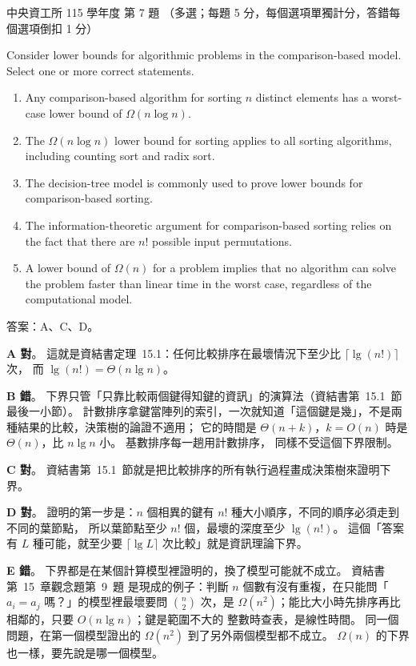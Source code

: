 \begin{pastexam}[label={px:ncu-115-dsa-07}]{中央資工所 115 學年度 第 7 題}
（多選；每題 5 分，每個選項單獨計分，答錯每個選項倒扣 1 分）

Consider lower bounds for algorithmic problems in the comparison-based model. Select one or more correct statements.
\begin{enumerate}[label=\Alph*.]
\item Any comparison-based algorithm for sorting $n$ distinct elements has a worst-case lower bound of $\Omega(n\log n)$.
\item The $\Omega(n\log n)$ lower bound for sorting applies to all sorting algorithms, including counting sort and radix sort.
\item The decision-tree model is commonly used to prove lower bounds for comparison-based sorting.
\item The information-theoretic argument for comparison-based sorting relies on the fact that there are $n!$ possible input permutations.
\item A lower bound of $\Omega(n)$ for a problem implies that no algorithm can solve the problem faster than linear time in the worst case, regardless of the computational model.
\end{enumerate}
\end{pastexam}

\begin{pastsoln}
答案：A、C、D。

\textbf{A 對}。 這就是資結書定理~15.1：任何比較排序在最壞情況下至少比 $\lceil \lg(n!) \rceil$ 次，
而 $\lg(n!) = \Theta(n \lg n)$。

\textbf{B 錯}。 下界只管「只靠比較兩個鍵得知鍵的資訊」的演算法（資結書第~15.1~節最後一小節）。
計數排序拿鍵當陣列的索引，一次就知道「這個鍵是幾」，不是兩種結果的比較，決策樹的論證不適用；
它的時間是 $\Theta(n + k)$，$k = O(n)$ 時是 $\Theta(n)$，比 $n \lg n$ 小。 基數排序每一趟用計數排序，
同樣不受這個下界限制。

\textbf{C 對}。 資結書第~15.1~節就是把比較排序的所有執行過程畫成決策樹來證明下界。

\textbf{D 對}。 證明的第一步是：$n$ 個相異的鍵有 $n!$ 種大小順序，不同的順序必須走到不同的葉節點，
所以葉節點至少 $n!$ 個，最壞的深度至少 $\lg(n!)$。 這個「答案有 $L$ 種可能，就至少要
$\lceil \lg L \rceil$ 次比較」就是資訊理論下界。

\textbf{E 錯}。 下界都是在某個計算模型裡證明的，換了模型可能就不成立。 資結書第~15~章觀念題第~9~題
是現成的例子：判斷 $n$ 個數有沒有重複，在只能問「$a_i = a_j$ 嗎？」的模型裡最壞要問
$\binom{n}{2}$ 次，是 $\Omega(n^2)$；能比大小時先排序再比相鄰的，只要 $O(n \lg n)$；鍵是範圍不大的
整數時查表，是線性時間。 同一個問題，在第一個模型證出的 $\Omega(n^2)$ 到了另外兩個模型都不成立。
$\Omega(n)$ 的下界也一樣，要先說是哪一個模型。
\end{pastsoln}
